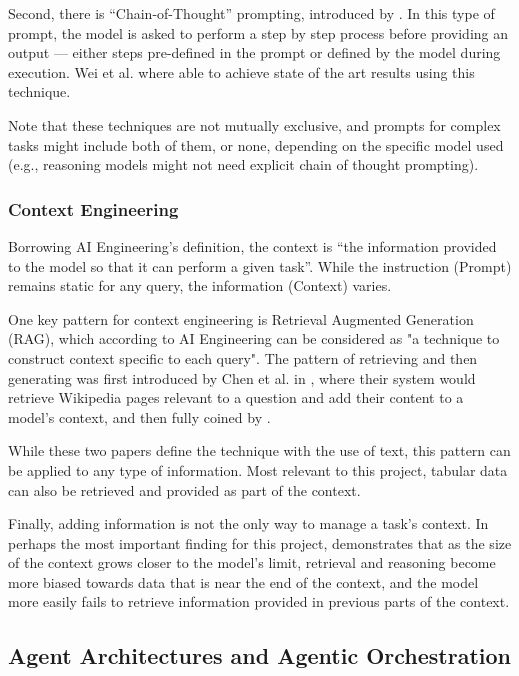 \documentclass[a4paper]{report}
\begin{document}
Second, there is ``Chain-of-Thought'' prompting, introduced by \cite{wei2023chainofthoughtpromptingelicitsreasoning}. In this type of prompt, the model is asked to perform a step by step process before providing an output --- either steps pre-defined in the prompt or defined by the model during execution. Wei et al. where able to achieve state of the art results using this technique.

Note that these techniques are not mutually exclusive, and prompts for complex tasks might include both of them, or none, depending on the specific model used (e.g., reasoning models might not need explicit chain of thought prompting).

\subsubsection{Context Engineering}

Borrowing AI Engineering's definition, the context is ``the information provided to the model so that it can perform a given task''. While the instruction (Prompt) remains static for any query, the information (Context) varies.

One key pattern for context engineering is Retrieval Augmented Generation (RAG), which according to AI Engineering can be considered as "a technique to construct context specific to each query". The pattern of retrieving and then generating was first introduced by Chen et al. in \cite{chen2017readingwikipediaansweropendomain}, where their system would retrieve Wikipedia pages relevant to a question and add their content to a model's context, and then fully coined by \cite{lewis2021retrievalaugmentedgeneration}.

While these two papers define the technique with the use of text, this pattern can be applied to any type of information. Most relevant to this project, tabular data can also be retrieved and provided as part of the context.

Finally, adding information is not the only way to manage a task's context. In perhaps the most important finding for this project, \cite{veseli2025positionalbiasesshiftinputs} demonstrates that as the size of the context grows closer to the model's limit, retrieval and reasoning become more biased towards data that is near the end of the context, and the model more easily fails to retrieve information provided in previous parts of the context.

\subsection{Agent Architectures and Agentic Orchestration}
\end{document}
